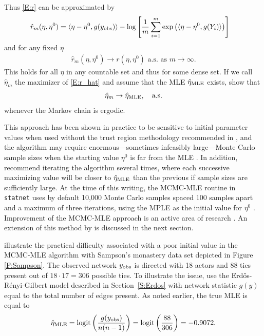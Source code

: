 Thus \eqref{E:r} can be approximated by
\begin{align}
\hat{r}_m( \eta, \eta^0 ) &= \langle  \eta - \eta^0, g(y_{\text{obs}}) \rangle - \log 
	\left [ \frac{1}{m} \sum_{i=1}^{m} \exp \left ( \langle  \eta - \eta^0, g(Y_i) \rangle \right ) \right ] 
	\label{E:r_hat}
\end{align}
and for any fixed $\eta$
\begin{align*}
	\hat{r}_m( \eta, \eta^0 ) \to r( \eta, \eta^0 ) \text{ a.s. as $m \to \infty$}.
\end{align*}
This holds for all $\eta$ in any countable set and thus for some dense set.
If we call $\hat{\eta}_m$  the maximizer of \eqref{E:r_hat} and assume that the MLE 
$\hat{\eta}_{\textrm{MLE}}$ exists, \citeauthor{Geyer:1992} show that 
\begin{align*}
	\hat{\eta}_m \to \hat{\eta}_{\textrm{MLE}}, \quad \text{a.s.}
\end{align*}
 whenever the Markov chain is ergodic. 
 
This approach has been shown in practice to be sensitive to initial parameter 
values when used without the trust region methodology recommended in \citet{Geyer:1992}, 
and the algorithm may require enormous---sometimes infeasibly large---Monte Carlo sample sizes 
when the starting value $\eta^0$ is far from the MLE \citep{ergm}.  
In addition, \citeauthor{Geyer:1992} recommend iterating the algorithm several times, 
where each successive maximizing value will be closer to $\hat{\eta}_{\textrm{MLE}}$ than the previous
if sample sizes are sufficiently large.  At the 
time of this writing, the MCMC-MLE routine in \texttt{statnet} uses by default 10,000 
Monte Carlo samples spaced 100 samples apart and a maximum of three iterations, using the 
MPLE as the initial value for $\eta^0$ \citep{statnet:R}.  
Improvement of the MCMC-MLE approach is an active area of research \citep*{Bartz}.
An extension of this method by \citet{Hummel} is discussed in the next section.

\citet{ergm} illustrate the practical difficulty associated with a poor initial 
value in the MCMC-MLE algorithm with Sampson's monastery data set depicted in 
Figure \ref{F:Sampson}.  The 
observed network $y_{\text{obs}}$ is directed with 18 actors and 88 ties present out of $18 \cdot 17=306$ possible 
ties.  To illustrate the issue, \citeauthor{ergm} use the Erd\H{o}s-R\'{e}nyi-Gilbert model 
described in Section~\ref{S:Erdos} with network statistic $g(y)$ equal to the total number of 
edges present.  As noted earlier, the true MLE is equal to 
\begin{align*}
	\hat{\eta}_{\textrm{MLE}} = \operatorname{logit}\left( \frac{g(y_{\text{obs}})}{n(n-1)}\right) = \operatorname{logit} \left( \frac{88}{306}\right ) = -0.9072.
\end{align*}
  
